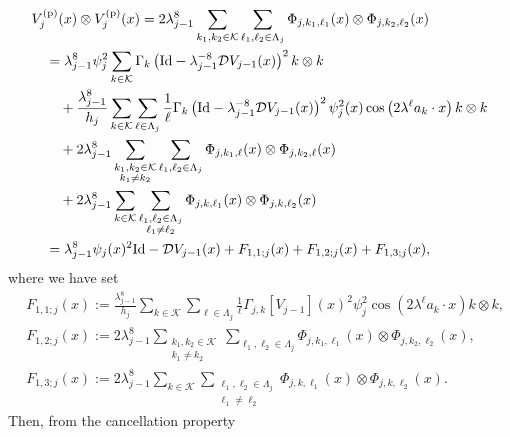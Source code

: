 \documentclass[a4paper,12pt,reqno]{amsart}
\theoremstyle{plain}
\theoremstyle{definition}
\newcommand{\Id}{{\rm Id}}
\newcommand{\lp}[1]{\left[#1\right]}
\renewcommand{\sp}[1]{\left(#1\right)}
\begin{document}
\begin{align}
    &
    V^{({\rm p})}_j(x) \otimes V^{({\rm p})}_j(x)
    ={}
    2\lambda_{j-1}^{8}
    \sum_{k_1, k_2 \in \mathcal{K}}
    \sum_{\ell_1,\ell_2 \in \Lambda_j}
    \Phi_{j,k_1,\ell_1}(x)
    \otimes
    \Phi_{j,k_2,\ell_2}(x)\\
    &\quad
    ={}
    \lambda_{j-1}^{8}
    \psi_{j}^2
    \sum_{k \in \mathcal{K}}
    \Gamma_k\sp{\Id-\lambda_{j-1}^{-8}\mathcal{D}V_{j-1}(x)}^2
    k \otimes k
    \\
    &\qquad
    +
    \frac{\lambda_{j-1}^{8}}{h_j}
    \sum_{k \in \mathcal{K}}
    \sum_{\ell \in \Lambda_j}
    \frac{1}{\ell}
    \Gamma_k\sp{\Id-\lambda_{j-1}^{-8}\mathcal{D}V_{j-1}(x)}^2
    \psi_{j}^2(x)
    \cos\sp{2\lambda^{\ell}a_k\cdot x}
    k \otimes k\\
    &\qquad
    +
    2\lambda_{j-1}^{8}
    \sum_{\substack{k_1,k_2 \in \mathcal{K} \\ k_1 \neq k_2}}
    \sum_{\ell_1,\ell_2 \in \Lambda_j}
    \Phi_{j,k_1,\ell}(x)
    \otimes 
    \Phi_{j,k_2,\ell}(x)\\
    &\qquad
    +
    2\lambda_{j-1}^{8}
    \sum_{k \in \mathcal{K}}
    \sum_{\substack{\ell_1,\ell_2 \in \Lambda_j \\ \ell_1 \neq \ell_2}}
    \Phi_{j,k,\ell_1}(x)
    \otimes 
    \Phi_{j,k,\ell_2}(x)\\
    &\quad
    ={}
    \lambda_{j-1}^{8}\psi_{j}(x)^2\Id
    -
    \mathcal{D}V_{j-1} (x)
    +F_{1,1;j}(x)
    +F_{1,2;j}(x)
    +F_{1,3;j}(x),
\end{align}
where we have set
\begin{align}
    &
    F_{1,1;j}(x)
    :=
    \frac{\lambda_{j-1}^{8}}{h_j}
    \sum_{k \in \mathcal{K}}
    \sum_{\ell \in \Lambda_j}
    \frac{1}{\ell}
    \Gamma_{j,k}\lp{V_{j-1}}(x)^2
    \psi_{j}^2
    \cos\sp{2\lambda^{\ell}a_k\cdot x}
    k \otimes k,
    \\
    &
    F_{1,2;j}(x)
    :=
    2\lambda_{j-1}^{8}
    \sum_{\substack{k_1,k_2 \in \mathcal{K} \\ k_1 \neq k_2}}
    \sum_{\ell_1,\ell_2 \in \Lambda_j}
    \Phi_{j,k_1,\ell_1}(x)
    \otimes
    \Phi_{j,k_2,\ell_2}(x),
    \\
    &
    F_{1,3;j}(x)
    :=
    2\lambda_{j-1}^{8}
    \sum_{k \in \mathcal{K}}
    \sum_{\substack{\ell_1,\ell_2 \in \Lambda_j \\ \ell_1 \neq \ell_2}}
    \Phi_{j,k,\ell_1}(x)
    \otimes 
    \Phi_{j,k,\ell_2}(x).
\end{align}
Then, from the cancellation property
\end{document}
